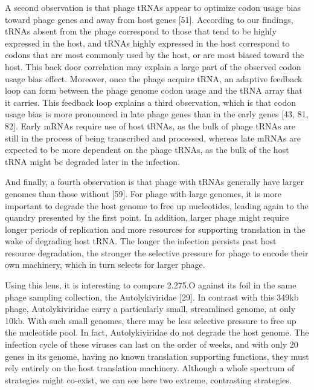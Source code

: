 \documentclass[12pt,twoside]{mitthesis-manusdown}
\begin{document}
A second observation is that phage tRNAs appear to optimize codon usage
bias toward phage genes and away from host genes {[}51{]}. According to
our findings, tRNAs absent from the phage correspond to those that tend
to be highly expressed in the host, and tRNAs highly expressed in the
host correspond to codons that are most commonly used by the host, or
are most biased toward the host. This back door correlation may explain
a large part of the observed codon usage bias effect. Moreover, once the
phage acquire tRNA, an adaptive feedback loop can form between the phage
genome codon usage and the tRNA array that it carries. This feedback
loop explains a third observation, which is that codon usage bias is
more pronounced in late phage genes than in the early genes {[}43, 81,
82{]}. Early mRNAs require use of host tRNAs, as the bulk of phage tRNAs
are still in the process of being transcribed and processed, whereas
late mRNAs are expected to be more dependent on the phage tRNAs, as the
bulk of the host tRNA might be degraded later in the infection.

And finally, a fourth observation is that phage with tRNAs generally
have larger genomes than those without {[}59{]}. For phage with large
genomes, it is more important to degrade the host genome to free up
nucleotides, leading again to the quandry presented by the first point.
In addition, larger phage might require longer periods of replication
and more resources for supporting translation in the wake of degrading
host tRNA. The longer the infection persists past host resource
degradation, the stronger the selective pressure for phage to encode
their own machinery, which in turn selects for larger phage.

Using this lens, it is interesting to compare 2.275.O against its foil
in the same phage sampling collection, the Autolykiviridae {[}29{]}. In
contrast with this 349kb phage, Autolykiviridae carry a particularly
small, streamlined genome, at only 10kb. With such small genomes, there
may be less selective pressure to free up the nucleotide pool. In fact,
Autolykiviridae do not degrade the host genome. The infection cycle of
these viruses can last on the order of weeks, and with only 20 genes in
its genome, having no known translation supporting functions, they must
rely entirely on the host translation machinery. Although a whole
spectrum of strategies might co-exist, we can see here two extreme,
contrasting strategies.
\end{document}

